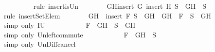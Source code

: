 \begin{isabellebody}
\ \ \ \ \ \ \ \ \isamarkupfalse%
\ {\isacharparenleft}rule\ insert{\isacharunderscore}is{\isacharunderscore}Un{\isacharparenright}\isanewline
\ \ \ \ \ \ \isamarkupfalse%
\ GH{\isacharcolon}{\isachardoublequoteopen}insert\ G\ {\isacharparenleft}insert\ H\ S{\isacharprime}{\isacharparenright}\ {\isacharequal}\ {\isacharbraceleft}G{\isacharcomma}H{\isacharbraceright}\ {\isasymunion}\ S{\isacharprime}{\isachardoublequoteclose}\isanewline
\ \ \ \ \ \ \ \ \isamarkupfalse%
\ {\isacharparenleft}rule\ insertSetElem{\isacharparenright}\isanewline
\ \ \ \ \ \ \isamarkupfalse%
\ {\isachardoublequoteopen}{\isacharbraceleft}G{\isacharcomma}H{\isacharbraceright}\ {\isasymunion}\ {\isacharparenleft}insert\ F\ {\isacharparenleft}S{\isacharprime}\ {\isacharminus}\ {\isacharbraceleft}G{\isacharcomma}H{\isacharbraceright}{\isacharparenright}{\isacharparenright}\ {\isacharequal}\ {\isacharbraceleft}G{\isacharcomma}H{\isacharbraceright}\ {\isasymunion}\ {\isacharparenleft}{\isacharbraceleft}F{\isacharbraceright}\ {\isasymunion}\ {\isacharparenleft}S{\isacharprime}\ {\isacharminus}\ {\isacharbraceleft}G{\isacharcomma}H{\isacharbraceright}{\isacharparenright}{\isacharparenright}{\isachardoublequoteclose}\isanewline
\ \ \ \ \ \ \ \ \isamarkupfalse%
\ {\isacharparenleft}simp\ only{\isacharcolon}\ IU{}{\isacharparenright}\isanewline
\ \ \ \ \ \ \isamarkupfalse%
\ \isamarkupfalse%
\ {\isachardoublequoteopen}{\isasymdots}\ {\isacharequal}\ {\isacharbraceleft}F{\isacharbraceright}\ {\isasymunion}\ {\isacharparenleft}{\isacharbraceleft}G{\isacharcomma}H{\isacharbraceright}\ {\isasymunion}\ {\isacharparenleft}S{\isacharprime}\ {\isacharminus}\ {\isacharbraceleft}G{\isacharcomma}H{\isacharbraceright}{\isacharparenright}{\isacharparenright}{\isachardoublequoteclose}\isanewline
\ \ \ \ \ \ \ \ \isamarkupfalse%
\ {\isacharparenleft}simp\ only{\isacharcolon}\ Un{\isacharunderscore}left{\isacharunderscore}commute{\isacharparenright}\isanewline
\ \ \ \ \ \ \isamarkupfalse%
\ \isamarkupfalse%
\ {\isachardoublequoteopen}{\isasymdots}\ {\isacharequal}\ {\isacharbraceleft}F{\isacharbraceright}\ {\isasymunion}\ {\isacharparenleft}{\isacharbraceleft}G{\isacharcomma}H{\isacharbraceright}\ {\isasymunion}\ S{\isacharprime}{\isacharparenright}{\isachardoublequoteclose}\isanewline
\ \ \ \ \ \ \ \ \isamarkupfalse%
\ {\isacharparenleft}simp\ only{\isacharcolon}\ Un{\isacharunderscore}Diff{\isacharunderscore}cancel{\isacharparenright}\isanewline

\end{isabellebody}
